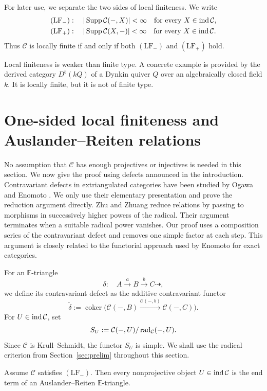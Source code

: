 \documentclass[11pt, twoside]{article}
\def\C{\mathcal{C}}
\def\E{\mathbb{E}}
\numberwithin{equation}{section}
\newcommand{\coker}{\operatorname{coker}}
\begin{document}
For later use, we separate the two sides of local finiteness.  We write
\begin{align*}
 (\mathrm{LF}_-)&:\quad |\Supp\C(-,X)|<\infty
 \quad\text{for every }X\in\ind\C,\\
 (\mathrm{LF}_+)&:\quad |\Supp\C(X,-)|<\infty
 \quad\text{for every }X\in\ind\C.
\end{align*}
Thus $\C$ is locally finite if and only if both $(\mathrm{LF}_-)$ and
$(\mathrm{LF}_+)$ hold.

Local finiteness is weaker than finite type.  A concrete example is provided by the derived category $D^b(kQ)$ of a Dynkin
quiver $Q$ over an algebraically closed field $k$. It is locally finite, but  it is not of finite type.

\section{One-sided local finiteness and Auslander--Reiten relations}\label{sec:one-sided}

No assumption that $\C$ has enough projectives or injectives is needed in this section.  We now give the proof using defects announced in the introduction.  Contravariant defects in extriangulated categories have been studied by Ogawa \cite{Ogawa2021} and Enomoto \cite{Enomoto2021}.  We only use their elementary presentation and prove the reduction argument directly.  Zhu and Zhuang \cite[Theorem~4.4]{ZhuZhuang2021} reduce relations by passing to morphisms in successively higher powers of the radical.  Their argument terminates when a suitable radical power vanishes.  Our proof uses a composition series of the contravariant defect and removes one simple factor at each step.  This argument is closely related to the functorial approach used by Enomoto \cite{Enomoto2019} for exact categories.


For an $\E$-triangle
$$
 \delta:\quad A\xrightarrow{a}B\xrightarrow{b}C\dashrightarrow,
$$
we define its contravariant defect as the additive contravariant functor
$$
 \widetilde\delta
 :=\coker\bigl(\C(-,B)\xrightarrow{\C(-,b)}\C(-,C)\bigr).
$$
For $U\in\ind\C$, set
$$
 S_U:=\C(-,U)/\rad_\C(-,U).
$$
Since $\C$ is Krull--Schmidt, the functor $S_U$ is simple.  We shall use the radical criterion from Section~\ref{sec:prelim} throughout this section.


\begin{lemma}\label{lem:one-sided-AR}
Assume $\C$ satisfies $(\mathrm{LF}_-)$.  Then every nonprojective object
$U\in\ind\C$ is the end term of an Auslander--Reiten $\E$-triangle.
\end{lemma}
\end{document}
